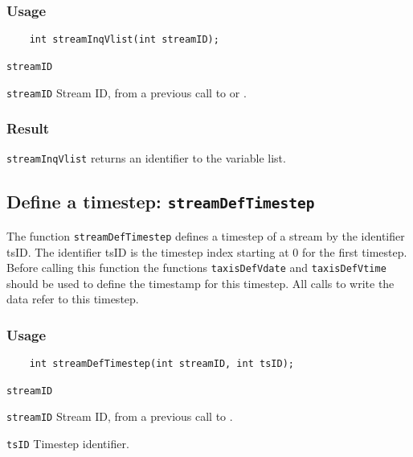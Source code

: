 \subsubsection*{Usage}

\begin{verbatim}
    int streamInqVlist(int streamID);
\end{verbatim}

\hspace*{4mm}\begin{minipage}[]{15cm}
\begin{deflist}{\texttt{streamID}\ }
\item[\texttt{streamID}]
Stream ID, from a previous call to {} or {}.

\end{deflist}
\end{minipage}

\subsubsection*{Result}

{\texttt{streamInqVlist}} returns an identifier to the variable list.



\subsection{Define a timestep: \texttt{streamDefTimestep}}
\label{streamDefTimestep}

The function {\texttt{streamDefTimestep}} defines a timestep of a stream by the identifier tsID.
The identifier tsID is the timestep index starting at 0 for the first timestep.
Before calling this function the functions {\texttt{taxisDefVdate}} and {\texttt{taxisDefVtime}} should be used
to define the timestamp for this timestep. All calls to write the data refer to this timestep.

\subsubsection*{Usage}

\begin{verbatim}
    int streamDefTimestep(int streamID, int tsID);
\end{verbatim}

\hspace*{4mm}\begin{minipage}[]{15cm}
\begin{deflist}{\texttt{streamID}\ }
\item[\texttt{streamID}]
Stream ID, from a previous call to {}.
\item[\texttt{tsID}]
Timestep identifier.

\end{deflist}
\end{minipage}

